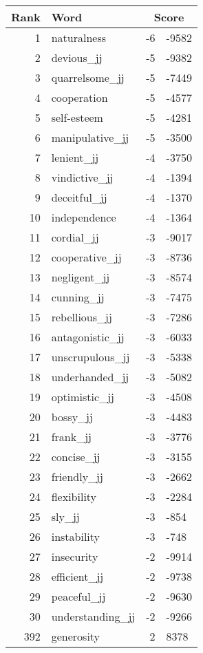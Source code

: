 \begin{longtable}[!htbp]{| rlr@{.}l |}
    \hline
    \textbf{Rank} & \textbf{Word} & \multicolumn{2}{c|}{\textbf{Score}} \\
    \hline
    \endhead
    1 & naturalness & -6 & -9582 \\
    2 & devious\_jj & -5 & -9382 \\
    3 & quarrelsome\_jj & -5 & -7449 \\
    4 & cooperation & -5 & -4577 \\
    5 & self-esteem & -5 & -4281 \\
    6 & manipulative\_jj & -5 & -3500 \\
    7 & lenient\_jj & -4 & -3750 \\
    8 & vindictive\_jj & -4 & -1394 \\
    9 & deceitful\_jj & -4 & -1370 \\
    10 & independence & -4 & -1364 \\
    11 & cordial\_jj & -3 & -9017 \\
    12 & cooperative\_jj & -3 & -8736 \\
    13 & negligent\_jj & -3 & -8574 \\
    14 & cunning\_jj & -3 & -7475 \\
    15 & rebellious\_jj & -3 & -7286 \\
    16 & antagonistic\_jj & -3 & -6033 \\
    17 & unscrupulous\_jj & -3 & -5338 \\
    18 & underhanded\_jj & -3 & -5082 \\
    19 & optimistic\_jj & -3 & -4508 \\
    20 & bossy\_jj & -3 & -4483 \\
    21 & frank\_jj & -3 & -3776 \\
    22 & concise\_jj & -3 & -3155 \\
    23 & friendly\_jj & -3 & -2662 \\
    24 & flexibility & -3 & -2284 \\
    25 & sly\_jj & -3 & -854 \\
    26 & instability & -3 & -748 \\
    27 & insecurity & -2 & -9914 \\
    28 & efficient\_jj & -2 & -9738 \\
    29 & peaceful\_jj & -2 & -9630 \\
    30 & understanding\_jj & -2 & -9266 \\
    392 & generosity & 2 & 8378 \\

\end{longtable}
